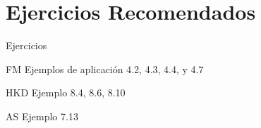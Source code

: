 \documentclass[xcolor={usenames,svgnames,dvipsnames}]{beamer}
\begin{document}
\section{Ejercicios Recomendados}
\label{sec:org0ae225e}

\begin{frame}[label={sec:orgc98985a}]{Ejercicios}
\begin{block}{FM}
Ejemplos de aplicación 4.2, 4.3, 4.4, y 4.7
\end{block}
\begin{block}{HKD}
Ejemplo 8.4, 8.6, 8.10
\end{block}
\begin{block}{AS}
Ejemplo 7.13
\end{block}
\end{frame}
\end{document}
